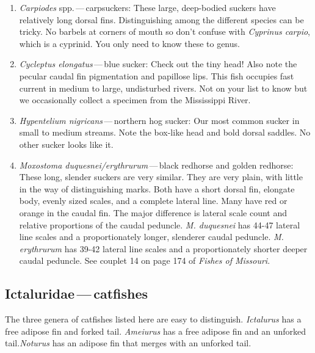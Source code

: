 \documentclass[11pt]{article}
\begin{document}
\begin{enumerate}
\item \textit{Carpiodes} spp.\,—\,carpsuckers:  These large, deep-bodied suckers have relatively long dorsal fins.  Distinguishing among the different species can be tricky.  No barbels at corners of mouth so don’t confuse with \textit{Cyprinus carpio}, which is a cyprinid.  You only need to know these to genus.
\item \textit{Cycleptus elongatus}\,—\,blue sucker: Check out the tiny head!  Also note the pecular caudal fin pigmentation and papillose lips.  This fish occupies fast current in medium to large, undisturbed rivers.  Not on your list to know but we occasionally collect a specimen from the Mississippi River.
\item \textit{Hypentelium nigricans}\,—\,northern hog sucker:  Our most common sucker in small to medium streams.  Note the box-like head and bold dorsal saddles.  No other sucker looks like it.
\item \textit{Moxostoma duquesnei/erythrurum}\,—\,black redhorse and golden redhorse:  These long, slender suckers are very similar.  They are very plain, with little in the way of distinguishing marks.  Both have a short dorsal fin, elongate body, evenly sized scales, and a complete lateral line.  Many have red or orange in the caudal fin.  The major difference is lateral scale count and relative proportions of the caudal peduncle. \textit{M. duquesnei} has 44-47 lateral line scales and a proportionately longer, slenderer caudal peduncle. \textit{M. erythrurum} has 39-42 lateral line scales and a proportionately shorter deeper caudal peduncle. See couplet 14 on page 174 of \textit{Fishes of Missouri}.
\end{enumerate}


\subsection*{Ictaluridae\,—\,catfishes}

The three genera of catfishes listed here are easy to distinguish.  \textit{Ictalurus} has a free adipose fin and forked tail. \textit{Ameiurus} has a free adipose fin and an unforked tail.\textit{Noturus} has an adipose fin that merges with an unforked tail.
\end{document}
